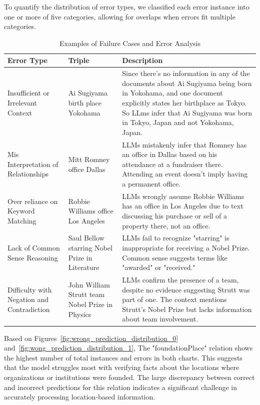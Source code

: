 To quantify the distribution of error types, we classified each error instance into one or more of five categories, allowing for overlaps when errors fit multiple categories.
\begin{table}[h!]
    \footnotesize
    \begin{xltabular}{\linewidth}{p{3cm}p{3cm}X}
        \toprule
        \textbf{Error Type} & \textbf{Triple} & \textbf{Description} \\
        \midrule
        Insufficient or Irrelevant Context & Ai Sugiyama birth place Yokohama & Since there's no information in any of the documents about Ai Sugiyama being born in Yokohama, and one document explicitly states her birthplace as Tokyo. So LLms infer that Ai Sugiyama was born in Tokyo, Japan and not Yokohama, Japan. \\
        Mis Interpretation of Relationships & Mitt Romney office Dallas & LLMs mistakenly infer that Romney has an office in Dallas based on his attendance at a fundraiser there. Attending an event doesn't imply having a permanent office. \\
        Over reliance on Keyword Matching & Robbie Williams office Los Angeles & LLMs wrongly assume Robbie Williams has an office in Los Angeles due to text discussing his purchase or sell of a property there, not an office. \\
        Lack of Common Sense Reasoning & Saul Bellow starring Nobel Prize in Literature & LLMs fail to recognize "starring" is inappropriate for receiving a Nobel Prize. Common sense suggests terms like "awarded" or "received." \\
        Difficulty with Negation and Contradiction & John William Strutt team Nobel Prize in Physics & LLMs confirm the presence of a team, despite no evidence suggesting Strutt was part of one. The context mentions Strutt’s Nobel Prize but lacks information about team involvement. \\
        \bottomrule
    \end{xltabular}
    \caption{Examples of Failure Cases and Error Analysis}
    \label{tab:factbench-failure-analysis}
\end{table}

Based on Figures~\ref{fig:wrong_prediction_distribution_0} and~\ref{fig:wong_prediction_distribution_1}, The "foundationPlace" relation shows the highest number of total instances and errors in both charts.
This suggests that the model struggles most with verifying facts about the locations where organizations or institutions were founded.
The large discrepancy between correct and incorrect predictions for this relation indicates a significant challenge in accurately processing location-based information.

